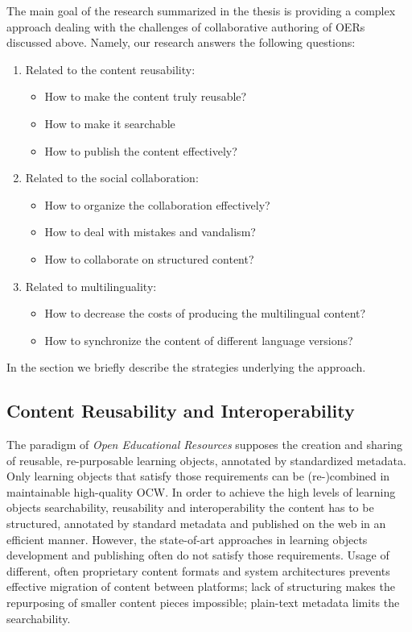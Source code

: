 \documentclass[ngerman,UKenglish,table]{scrbook}
\begin{document}
The main goal of the research summarized in the thesis is providing a complex approach dealing with the challenges of collaborative authoring of OERs discussed above.
Namely, our research answers the following questions:
\begin{enumerate}
\item Related to the content reusability: 
\begin{itemize}
\item How to make the content truly reusable?
\item How to make it searchable
\item How to publish the content effectively?
\end{itemize} 
\item Related to the social collaboration: 
\begin{itemize}
\item How to organize the collaboration effectively?
\item How to deal with mistakes and vandalism?
\item How to collaborate on structured content?
\end{itemize}
\item Related to multilinguality: 
\begin{itemize}
\item How to decrease the costs of producing the multilingual content?
\item How to synchronize the content of different language versions?
\end{itemize}
\end{enumerate}
In the section we briefly describe the strategies underlying the approach.

\subsection{Content Reusability and Interoperability}
\label{sec:content_reusability_structuring}
The paradigm of \emph{Open Educational Resources} supposes the creation and sharing of reusable, re-purposable learning objects, annotated by standardized metadata.
Only learning objects that satisfy those requirements can be (re-)combined in maintainable high-quality OCW.
In order to achieve the high levels of learning objects searchability, reusability and interoperability the content has to be structured, annotated by standard metadata and  published on the web in an efficient manner.
However, the state-of-art approaches in learning objects development and publishing often do not satisfy those requirements.
Usage of different, often proprietary content formats and system architectures prevents effective migration of content between platforms; lack of structuring makes the repurposing of smaller content pieces impossible; plain-text metadata limits the searchability.
\end{document}

